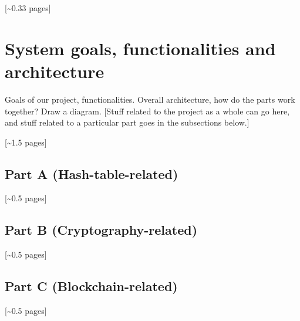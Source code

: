\documentclass[12pt,a4paper,draft]{article}
\begin{document}
[\textasciitilde{}0.33 pages]

\section{System goals, functionalities and architecture}

Goals of our project, functionalities.
Overall architecture, how do the parts work together?
Draw a diagram.
[Stuff related to the project as a whole can go here, and stuff related to a particular part goes in the subsections below.]

[\textasciitilde{}1.5 pages]

\subsection{Part A (Hash-table-related)}

[\textasciitilde{}0.5 pages]

\subsection{Part B (Cryptography-related)}

[\textasciitilde{}0.5 pages]

\subsection{Part C (Blockchain-related)}

[\textasciitilde{}0.5 pages]
\end{document}
